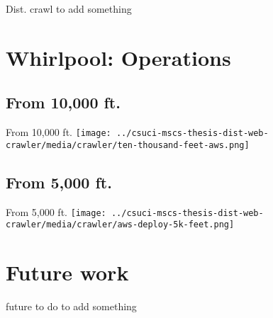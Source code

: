 \documentclass[9pt]{beamer}
\begin{document}

\begin{frame}{Dist. crawl}
  to add something
\end{frame}


\section[Opworks]{Whirlpool: Operations}
\begin{frame}[plain]
\end{frame}


\subsection{From 10,000 ft.}
\begin{frame}{From 10,000 ft.}
 \centering
 \texttt{[image: ../csuci-mscs-thesis-dist-web-crawler/media/crawler/ten-thousand-feet-aws.png]} 
\end{frame}


\subsection{From 5,000 ft.}
\begin{frame}{From 5,000 ft.}
  \centering
  \texttt{[image: ../csuci-mscs-thesis-dist-web-crawler/media/crawler/aws-deploy-5k-feet.png]}
\end{frame}


\section[Future]{Future work}
\begin{frame}[plain]
\end{frame}


\begin{frame}{future to do}
  to add something
\end{frame}


%  


\begin{frame}[plain]
\end{frame}
\end{document}
